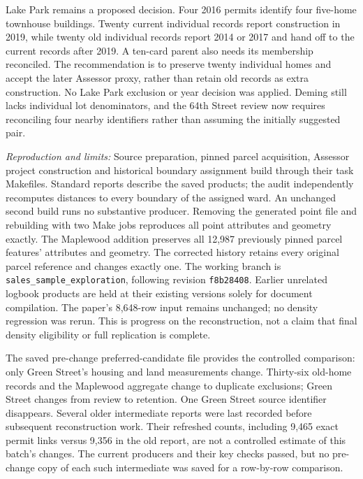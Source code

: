 Lake Park remains a proposed decision. Four 2016 permits identify four five-home
townhouse buildings. Twenty current individual records report construction in
2019, while twenty old individual records report 2014 or 2017 and hand off to
the current records after 2019. A ten-card parent also needs its membership
reconciled. The recommendation is to preserve twenty individual homes and accept
the later Assessor proxy, rather than retain old records as extra construction.
No Lake Park exclusion or year decision was applied. Deming still lacks
individual lot denominators, and the 64th Street review now requires reconciling
four nearby identifiers rather than assuming the initially suggested pair.

\clearpage
\textit{Reproduction and limits:} Source preparation, pinned parcel acquisition,
Assessor project construction and historical boundary assignment build through
their task Makefiles. Standard reports describe the saved products; the audit
independently recomputes distances to every boundary of the assigned ward.
An unchanged second build runs no substantive producer. Removing the generated
point file and rebuilding with two Make jobs reproduces all point attributes
and geometry exactly. The Maplewood addition preserves all 12,987 previously pinned parcel features'
attributes and geometry. The corrected history retains every original parcel
reference and changes exactly one. The working branch is
\texttt{sales\_sample\_exploration}, following revision \texttt{f8b28408}.
Earlier unrelated logbook products are held at their existing versions solely
for document compilation. The paper's 8,648-row input remains unchanged;
no density regression was rerun. This is progress on the reconstruction, not
a claim that final density eligibility or full replication is complete.

The saved pre-change preferred-candidate file provides the controlled comparison:
only Green Street's housing and land measurements change. Thirty-six old-home
records and the Maplewood aggregate change to duplicate exclusions; Green Street
changes from review to retention. One Green Street source identifier disappears.
Several older intermediate reports were last recorded before subsequent
reconstruction work. Their refreshed counts, including 9,465 exact permit links
versus 9,356 in the old report, are not a controlled estimate of this batch's
changes. The current producers and their key checks passed, but no pre-change
copy of each such intermediate was saved for a row-by-row comparison.

